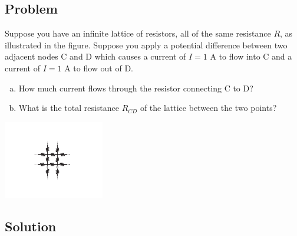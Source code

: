 \documentclass[solutions]{esg8022pset}
\begin{document}
\subsection{Problem}
  Suppose you have an infinite lattice of resistors, all of the same resistance $R$, as illustrated in the figure. Suppose you apply a potential difference between two adjacent nodes C and D which causes a current of $I = 1$ A to flow into C and a current of $I = 1$ A to flow out of D.
  \begin{enumerate}[(a)]
   \item How much current flows through the resistor connecting C to D?
   \item What is the total resistance $R_{CD}$ of the lattice between the two points?
  \end{enumerate}
  \begin{center}\includegraphics[width=0.33\textwidth]{ps06_09_01}\end{center}
\subsection{Solution}
\end{document}
